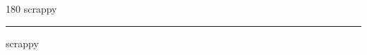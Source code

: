 
\begin{frame}
\begin{center}
\begin{turn}{180}
{\fontsize{2.5cm}{1em}\selectfont scrappy}
\end{turn}
\vspace{1em}\par  
\hrule
\vspace{1em}\par  
{\fontsize{2.5cm}{1em}\selectfont scrappy}
\end{center}
\end{frame}
